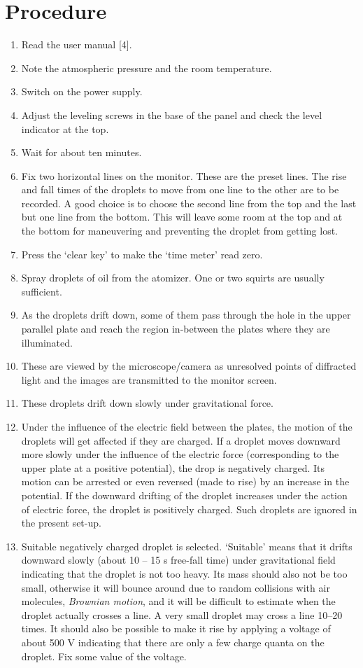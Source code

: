 \documentclass[%
sor,
 jor,
 amsmath,amssymb,
 reprint,%
]{revtex4-2}
\begin{document}
\section{Procedure}
\begin{enumerate}
	\item Read the user manual [4]. 
    \item Note the atmospheric pressure and the room temperature.
    \item Switch on the power supply.
    \item Adjust the leveling screws in the base of the panel and check the level indicator at the top.
    \item Wait for about ten minutes.
    \item Fix two horizontal lines on the monitor. These are the preset lines. The rise and fall times of the droplets to move from one line to the other are to be recorded. A good choice is to choose the second line from the top and the last but one line from the bottom. This will leave some room at the {top} and at the {bottom} for maneuvering and preventing the droplet from getting lost.
    \item Press the ‘clear key’ to make the ‘time meter’ read zero.
    \item Spray droplets of oil from the atomizer. One or two squirts are usually sufficient.
    \item As the droplets drift down, some of them pass through the hole in the upper parallel plate and reach the region in-between the plates where they are illuminated.
    \item These are viewed by the microscope/camera as unresolved points of diffracted light and the images are transmitted to the monitor screen.
    \item These droplets drift down slowly under gravitational force.
    \item {Under the influence of the electric field} between the plates, the motion of the droplets will get affected if they are charged. If a droplet moves downward more slowly under the influence of the electric force (corresponding to the upper plate at a positive potential), the drop is negatively charged. Its motion can be arrested or even reversed (made to rise) by an increase in the potential. If the downward drifting of the droplet increases under the action of electric force, the droplet is positively charged. Such droplets are ignored in the present set-up.
    \item Suitable negatively charged droplet is selected. ‘Suitable’ means that it drifts downward slowly (about 10 – 15 s free-fall time) under gravitational field indicating that the droplet is not too heavy. Its mass should also not be too small, otherwise it will bounce around due to random collisions with air molecules, \textit{Brownian motion}, and it will be difficult to estimate when the droplet actually crosses a line. A very small droplet may cross a line 10–20 times. It should also be possible to make it rise by applying a voltage of about 500 V indicating that there are only a few charge quanta on the droplet. Fix some value of the voltage.

\end{enumerate}
\end{document}
